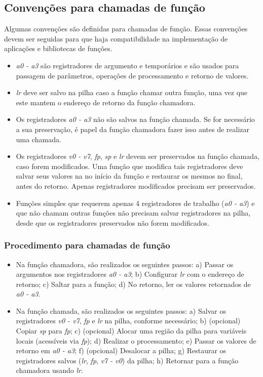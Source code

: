 \documentclass[11pt,a4paper]{report}
\begin{document}
\subsection{Convenções para chamadas de função}

Algumas convenções são definidas para chamadas de função. Essas
convenções devem ser seguidas para que haja compatibilidade na
implementação de aplicações e bibliotecas de funções.

\begin{itemize}
\item \textit{a0 - a3} são registradores de argumento e temporários e
são usados para passagem de parâmetros, operações de processamento e
retorno de valores.
\item \textit{lr} deve ser salvo na pilha caso a função chamar outra
função, uma vez que este mantem o endereço de retorno da função
chamadora.
\item Os registradores \textit{a0 - a3} não são salvos na função chamada.
Se for necessário a sua preservação, é papel da função chamadora fazer
isso antes de realizar uma chamada.
\item Os registradores \textit{v0 - v7}, \textit{fp}, \textit{sp} e
\textit{lr} devem ser preservados na função chamada, caso forem modificados.
Uma função que modifica tais registradores deve salvar seus valores na
no início da função e restaurar os mesmos no final, antes do retorno.
Apenas registradores modificados precisam ser preservados.
\item Funções simples que requerem apenas 4 registradores de trabalho
(\textit{a0 - a3}) e que não chamam outras funções não precisam salvar
registradores na pilha, desde que os registradores preservados não forem
modificados.
\end{itemize}

\subsubsection{Procedimento para chamadas de função}

\begin{itemize}
\item Na função chamadora, são realizados os seguintes passos: a) Passar os
argumentos nos registradores \textit{a0 - a3}; b) Configurar \textit{lr}
com o endereço de retorno; c) Saltar para a função; d) No retorno, ler
os valores retornados de \textit{a0 - a3}.
\item Na função chamada, são realizados os seguintes passos: a) Salvar os
registradores \textit{v0 - v7}, \textit{fp} e \textit{lr} na pilha,
conforme necessário; b) (opcional) Copiar \textit{sp} para \textit{fp};
c) (opcional) Alocar uma região da pilha para variáveis locais
(acessíveis via \textit{fp}); d) Realizar o processamento; e) Passar os
valores de retorno em \textit{a0 - a3}; f) (opcional) Desalocar a pilha;
g) Restaurar os registradores salvos (\textit{lr}, \textit{fp},
\textit{v7 - v0}) da pilha; h) Retornar para a função chamadora usando
\textit{lr}.
\end{itemize}
\end{document}
